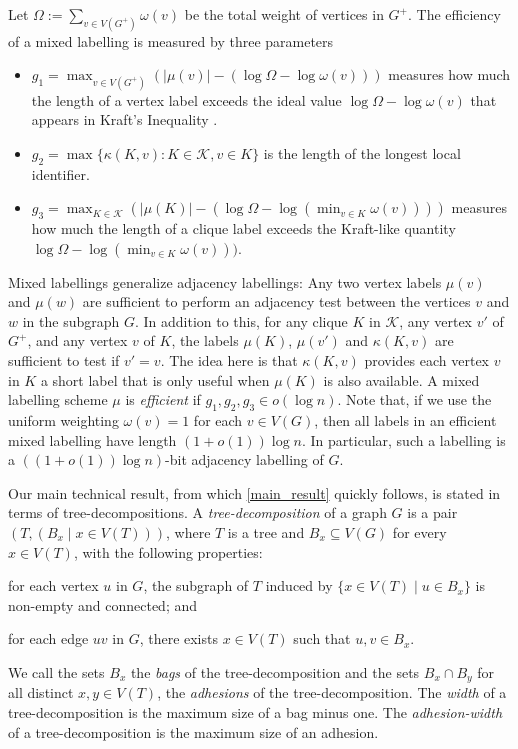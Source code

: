 \documentclass{patmorin}
\newcommand{\defin}[1]{\emph{\textcolor{brightmaroon}{#1}}}
\begin{document}
Let $\Omega:=\sum_{v\in V(G^+)}\omega(v)$ be the total weight of vertices in $G^+$.  The efficiency of a mixed labelling is measured by three parameters
\begin{itemize}
    \item $g_1=\max_{v\in V(G^+)} (|\mu(v)|-(\log\Omega - \log\omega(v)))$ measures how much the length of a vertex label exceeds the ideal value $\log\Omega-\log\omega(v)$ that appears in Kraft's Inequality \cite{Kraft1949}.
    \item $g_2=\max\{\kappa(K,v):K\in\mathcal{K}, v\in K\}$ is the length of the longest local identifier.
    \item $g_3=\max_{K\in\mathcal{K}} (|\mu(K)|-(\log\Omega - \log(\min_{v\in K}\omega(v))))$ measures how much the length of a clique label exceeds the Kraft-like quantity $\log\Omega - \log(\min_{v\in K}\omega(v)))$.
\end{itemize}


Mixed labellings generalize adjacency labellings: Any two vertex labels $\mu(v)$ and $\mu(w)$ are sufficient to perform an adjacency test between the vertices $v$ and $w$ in the subgraph $G$.  In addition to this, for any clique $K$ in $\mathcal{K}$, any vertex $v'$ of $G^+$, and any vertex $v$ of $K$, the labels $\mu(K)$, $\mu(v')$ and $\kappa(K,v)$ are sufficient to test if $v'=v$.  The idea here is that $\kappa(K,v)$ provides each vertex $v$ in $K$ a short label that is only useful when $\mu(K)$ is also available.   A mixed labelling scheme $\mu$ is \defin{efficient} if $g_1,g_2,g_3\in o(\log n)$.  Note that, if we use the uniform weighting $\omega(v)=1$ for each $v\in V(G)$, then all labels in an efficient mixed labelling have length $(1+o(1))\log n$.  In particular, such a labelling is a $((1+o(1))\log n)$-bit adjacency labelling of $G$.

Our main technical result, from which \cref{main_result} quickly follows, is stated in terms of tree-decompositions.  A \defin{tree-decomposition} of a graph $G$ is a pair $(T,(B_x \mid x \in V(T)))$,
where $T$ is a tree and $B_x \subseteq V(G)$ for every $x \in V(T)$, with the
following properties:
\begin{enumerate*}[label=(\alph*)]
	\item for each vertex $u$ in $G$, the subgraph of $T$ induced by $\{x \in V(T) \mid u \in B_x\}$ is non-empty and connected; and
	\item for each edge $uv$ in $G$, there exists $x\in V(T)$ such that $u,v\in B_x$.
\end{enumerate*}
We call the sets $B_x$ the \defin{bags} of the tree-decomposition and the sets $B_x\cap B_y$ for all distinct $x,y\in V(T)$, the \defin{adhesions} of the tree-decomposition.
The \defin{width} of a tree-decomposition is the maximum size of a bag minus one.
The \defin{adhesion-width} of a tree-decomposition is the maximum size of an adhesion.
\end{document}
